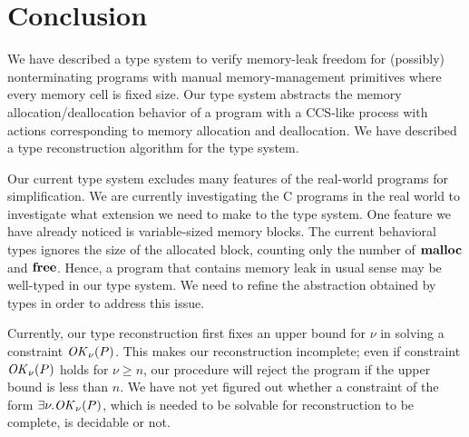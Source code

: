 \section{Conclusion}\label{sec:conclusion}

We have described a type system to verify memory-leak freedom for
(possibly) nonterminating programs with manual memory-management
primitives where every memory cell is fixed size.  Our type system
abstracts the memory allocation/deallocation behavior of a program
with a CCS-like process with actions corresponding to memory allocation
and deallocation.  We have described a type reconstruction algorithm
for the type system.

Our current type system excludes many features of the real-world
programs for simplification.  We are currently investigating the C
programs in the real world to investigate what extension we need to
make to the type system.  One feature we have already noticed is
variable-sized memory blocks.  The current behavioral types ignores
the size of the allocated block, counting only the number of
\(\mathbf{malloc}\) and \(\mathbf{free}\).  Hence, a program that contains memory leak
in usual sense may be well-typed in our type system.  We need to
refine the abstraction obtained by types in order to address this
issue.

Currently, our type reconstruction first fixes an upper bound for
\(\nu\) in solving a constraint \(\mathit{OK}_\nu(P)\).  This makes our
reconstruction incomplete; even if constraint \(\mathit{OK}_\nu(P)\) holds for
\(\nu \ge n\), our procedure will reject the program if the upper
bound is less than \(n\).  We have not yet figured out whether a
constraint of the form \(\exists \nu. \mathit{OK}_\nu(P)\), which is needed to
be solvable for reconstruction to be complete, is decidable or not.


